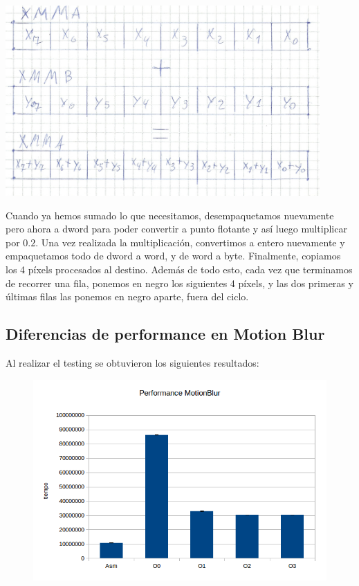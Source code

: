 \documentclass[a4paper]{article}
\begin{document}
\begin{center}
\includegraphics[width=0.9\textwidth]{Dibujos/sv.jpg}
\end{center}

Cuando ya hemos sumado lo que necesitamos, desempaquetamos nuevamente pero ahora a dword para poder convertir a punto flotante y así luego multiplicar por $0.2$. Una vez realizada la multiplicación, convertimos a entero nuevamente y empaquetamos todo de dword a word, y de word a byte. Finalmente, copiamos los 4 píxels procesados al destino. Además de todo esto, cada vez que terminamos de recorrer una fila, ponemos en negro los siguientes 4 píxels, y las dos primeras y últimas filas las ponemos en negro aparte, fuera del ciclo.

\subsection{Diferencias de performance en Motion Blur}

Al realizar el testing se obtuvieron los siguientes resultados:

\newpage

\begin{figure}[h!]
  \begin{center}
  \includegraphics[scale=0.66]{Graficos1.4/mbl/per.jpg}
  \label{nombreparareferenciar11}
  \end{center}
\end{figure}
\end{document}
